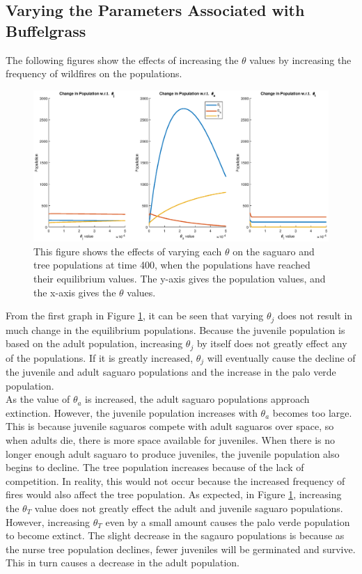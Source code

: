 \documentclass[a4paper]{article}
\begin{document}
\subsection{Varying the Parameters Associated with Buffelgrass}
The following figures show the effects of increasing the $\theta$ values by increasing the frequency of wildfires on the populations.
\begin{figure}[H]
\hspace{-1.5 cm}
\includegraphics[scale = 0.5]{PopsVSThetas.eps}
\caption{This figure shows the effects of varying each $\theta$ on the saguaro and tree populations at time 400, when the populations have reached their equilibrium values. The y-axis gives the population values, and the x-axis gives the $\theta$ values.}
\label{fig:VaryThetas}
\end{figure}
From the first graph in Figure \ref{fig:VaryThetas}, it can be seen that varying $\theta_j$ does not result in much change in the equilibrium populations. Because the juvenile population is based on the adult population, increasing $\theta_j$ by itself does not greatly effect any of the populations. If it is greatly increased, $\theta_j$ will eventually cause the decline of the juvenile and adult saguaro populations and the increase in the palo verde population.\\ 

As the value of $\theta_a$ is increased, the adult saguaro populations approach extinction. However, the juvenile population increases with $\theta_a$ becomes too large. This is because juvenile saguaros compete with adult saguaros over space, so when adults die, there is more space available for juveniles. When there is no longer enough adult saguaro to produce juveniles, the juvenile population also begins to decline. The tree population increases because of the lack of competition. In reality, this would not occur because the increased frequency of fires would also affect the tree population.
As expected, in Figure \ref{fig:VaryThetas}, increasing the $\theta_T$ value does not greatly effect the adult and juvenile saguaro populations. However, increasing $\theta_T$ even by a small amount causes the palo verde population to become extinct. The slight decrease in the sagauro populations is because as the nurse tree population declines, fewer juveniles will be germinated and survive. This in turn causes a decrease in the adult population.\\
\end{document}
